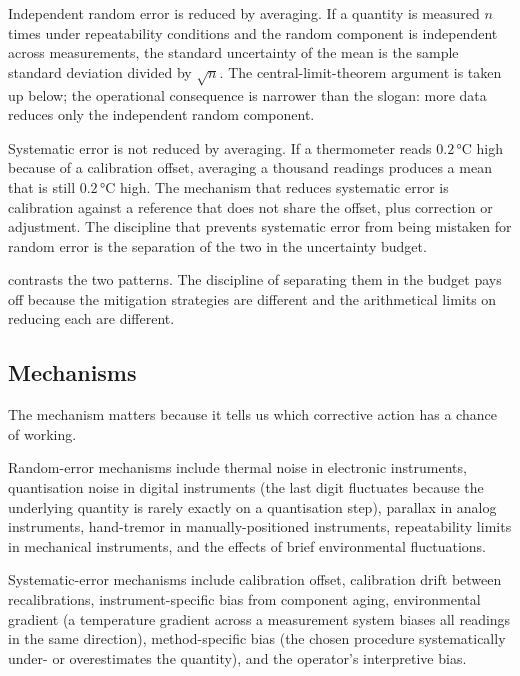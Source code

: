 Independent random error is reduced by averaging. If a quantity is
measured $n$ times under repeatability conditions and the random
component is independent across measurements, the standard
uncertainty of the mean is the sample standard deviation divided by
$\sqrt{n}$. The central-limit-theorem argument is taken up below; the
operational consequence is narrower than the slogan: more data
reduces only the independent random component.

Systematic error is not reduced by averaging. If a thermometer reads
$0.2 \,\si{\degreeCelsius}$ high because of a calibration offset,
averaging a thousand readings produces a mean that is still
$0.2 \,\si{\degreeCelsius}$ high. The mechanism that reduces
systematic error is calibration against a reference that does not
share the offset, plus correction or adjustment. The discipline
that prevents systematic error from being mistaken for random error
is the separation of the two in the uncertainty budget.



 contrasts the two
patterns. The discipline of separating them in the budget pays off
because the mitigation strategies are different and the
arithmetical limits on reducing each are different.

\subsection{Mechanisms}

The mechanism matters because it tells us which corrective action has
a chance of working.

Random-error mechanisms include thermal noise in electronic
instruments, quantisation noise in digital instruments (the last
digit fluctuates because the underlying quantity is rarely exactly
on a quantisation step), parallax in analog instruments,
hand-tremor in manually-positioned instruments, repeatability
limits in mechanical instruments, and the effects of brief
environmental fluctuations.

Systematic-error mechanisms include calibration offset, calibration
drift between recalibrations, instrument-specific bias from
component aging, environmental gradient (a temperature gradient
across a measurement system biases all readings in the same
direction), method-specific bias (the chosen procedure systematically
under- or overestimates the quantity), and the operator's
interpretive bias.

